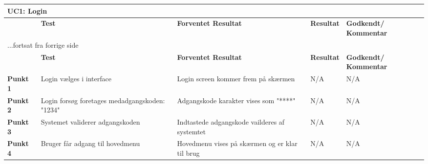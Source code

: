 
\begin{center}
\begin{longtable}{|p{}|p{}|p{3cm}|p{3cm}|p{3cm}|} %
\hline
\multicolumn{5}{|l|}{\textbf{UC1: Login}} \\ \hline
\multicolumn{1}{|c|}{} &
\textbf{Test} &
\textbf{Forventet \newline Resultat} &
\textbf{Resultat} &
\textbf{Godkendt/ \newline Kommentar} \\ \hline 
\endfirsthead

\multicolumn{5}{l}{...fortsat fra forrige side} \\ \hline 
\multicolumn{1}{|c|}{} &
\textbf{Test} &
\textbf{Forventet \newline Resultat} &
\textbf{Resultat} &
\textbf{Godkendt/ \newline Kommentar} \\ \hline 
\endhead


\textbf{Punkt 1}		
&Login vælges i interface	
&Login screen kommer frem på skærmen 	
&N/A 	
&N/A \\\hline
\textbf{Punkt 2}		
&Login forsøg foretages medadgangskoden: "1234"	
&Adgangskode karakter vises som "****" 	
&N/A 	
&N/A \\\hline
\textbf{Punkt 3}		
&Systemet validerer adgangskoden		
&Indtastede adgangskode vailderes af systemtet 	
&N/A 	
&N/A \\\hline
\textbf{Punkt 4}		
&Bruger får adgang til hovedmenu		
&Hovedmenu vises på skærmen og er klar til brug 	
&N/A 	
&N/A  \\\hline
	\end{longtable}
	\label{ATUC1} 
\end{center}